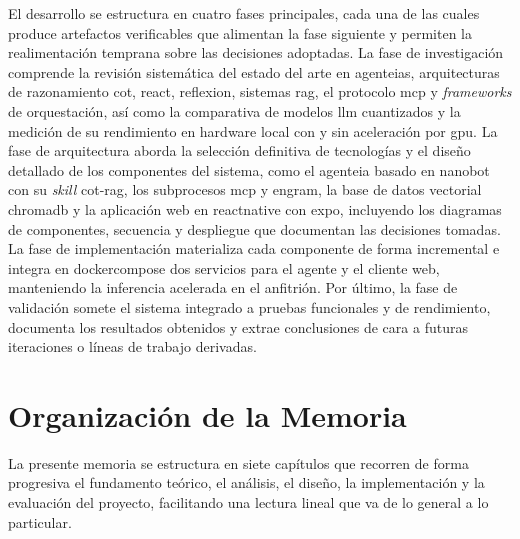 El desarrollo se estructura en cuatro fases principales, cada una de las cuales produce artefactos verificables que alimentan la fase siguiente y permiten la realimentación temprana sobre las decisiones adoptadas. La fase de investigación comprende la revisión sistemática del estado del arte en \glspl{agenteia}, arquitecturas de razonamiento \gls{cot}, \gls{react}, \gls{reflexion}, sistemas \gls{rag}, el protocolo \gls{mcp} y \textit{frameworks} de orquestación, así como la comparativa de modelos \gls{llm} cuantizados y la medición de su rendimiento en \gls{hardware} local con y sin aceleración por \gls{gpu}. La fase de arquitectura aborda la selección definitiva de tecnologías y el diseño detallado de los componentes del sistema, como el \gls{agenteia} basado en \gls{nanobot} con su \textit{skill} \gls{cot}-\gls{rag}, los subprocesos \gls{mcp} y \gls{engram}, la base de datos vectorial \gls{chromadb} y la aplicación web en \gls{reactnative} con \gls{expo}, incluyendo los diagramas de componentes, secuencia y despliegue que documentan las decisiones tomadas. La fase de implementación materializa cada componente de forma incremental e integra en \gls{dockercompose} dos servicios para el agente y el cliente web, manteniendo la inferencia acelerada en el anfitrión. Por último, la fase de validación somete el sistema integrado a pruebas funcionales y de rendimiento, documenta los resultados obtenidos y extrae conclusiones de cara a futuras iteraciones o líneas de trabajo derivadas.

\section{Organización de la Memoria}
\label{sec:organizacion}

La presente memoria se estructura en siete capítulos que recorren de forma progresiva el fundamento teórico, el análisis, el diseño, la implementación y la evaluación del proyecto, facilitando una lectura lineal que va de lo general a lo particular.

